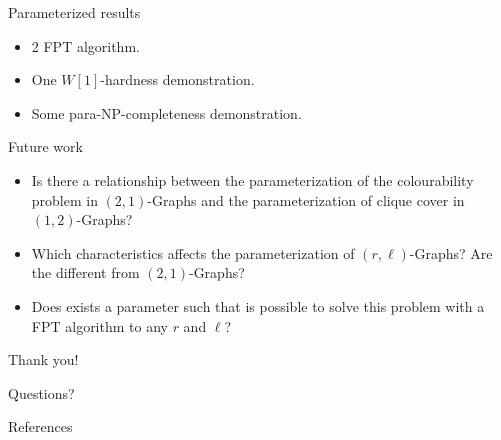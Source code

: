 \documentclass[9pt, compress]{beamer}
\newcommand{\?}{\textcolor{warn}{\textit{?}}}
\begin{document}
     \begin{frame}{Parameterized results}
       \begin{itemize}
         \item 2 FPT algorithm.
         \item One $W[1]$-hardness demonstration.
         \item Some para-NP-completeness demonstration.
       \end{itemize}
     \end{frame}
     \begin{frame}{Future work}
       \begin{itemize}
  \item  Is there a relationship between the parameterization of the colourability problem in $(2,1)$-Graphs and the parameterization of clique cover in $(1,2)$-Graphs?
  \item Which characteristics affects the parameterization of $(r,\ell)$-Graphs? Are the different from $(2,1)$-Graphs?
  \item Does exists a parameter such that is possible to solve this problem with a FPT algorithm to any $r$ and $\ell$?
\end{itemize}
     \end{frame}
     \begin{frame}[standout]
       Thank you!
       
       Questions?
     \end{frame}
     \begin{frame}{References}
       
       
     \end{frame}
\end{document}
